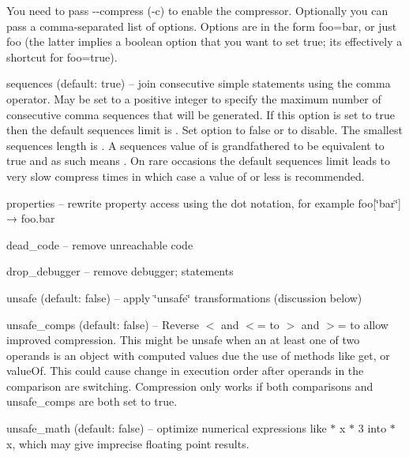 You need to pass {\ttfamily -\/-\/compress} ({\ttfamily -\/c}) to enable the compressor. Optionally you can pass a comma-\/separated list of options. Options are in the form {\ttfamily foo=bar}, or just {\ttfamily foo} (the latter implies a boolean option that you want to set {\ttfamily true}; it\textquotesingle{}s effectively a shortcut for {\ttfamily foo=true}).


\begin{DoxyItemize}
\item {\ttfamily sequences} (default\+: true) -- join consecutive simple statements using the comma operator. May be set to a positive integer to specify the maximum number of consecutive comma sequences that will be generated. If this option is set to {\ttfamily true} then the default {\ttfamily sequences} limit is {}. Set option to {\ttfamily false} or {} to disable. The smallest {\ttfamily sequences} length is {}. A {\ttfamily sequences} value of {} is grandfathered to be equivalent to {\ttfamily true} and as such means {}. On rare occasions the default sequences limit leads to very slow compress times in which case a value of {} or less is recommended.
\item {\ttfamily properties} -- rewrite property access using the dot notation, for example {\ttfamily foo\mbox{[}\char`\"{}bar\char`\"{}\mbox{]} → foo.\+bar}
\item {\ttfamily dead\+\_\+code} -- remove unreachable code
\item {\ttfamily drop\+\_\+debugger} -- remove {\ttfamily debugger;} statements
\item {\ttfamily unsafe} (default\+: false) -- apply \char`\"{}unsafe\char`\"{} transformations (discussion below)
\item {\ttfamily unsafe\+\_\+comps} (default\+: false) -- Reverse {\ttfamily $<$} and {\ttfamily $<$=} to {\ttfamily $>$} and {\ttfamily $>$=} to allow improved compression. This might be unsafe when an at least one of two operands is an object with computed values due the use of methods like {\ttfamily get}, or {\ttfamily value\+Of}. This could cause change in execution order after operands in the comparison are switching. Compression only works if both {\ttfamily comparisons} and {\ttfamily unsafe\+\_\+comps} are both set to true.
\item {\ttfamily unsafe\+\_\+math} (default\+: false) -- optimize numerical expressions like { $\ast$ x $\ast$ 3} into { $\ast$ x}, which may give imprecise floating point results.

\end{DoxyItemize}
